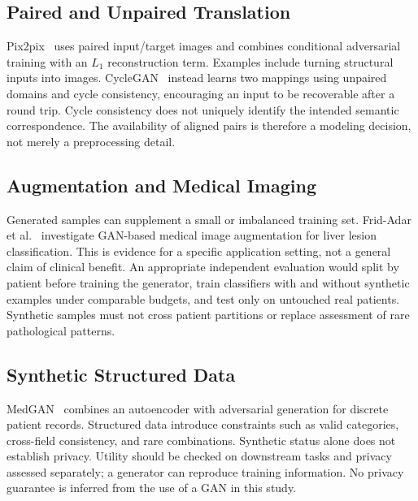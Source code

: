 \documentclass[conference]{IEEEtran}
\begin{document}
\subsection{Paired and Unpaired Translation}
Pix2pix~\cite{pix} uses paired input/target images and combines conditional adversarial training with an $L_1$ reconstruction term. Examples include turning structural inputs into images. CycleGAN~\cite{cycle} instead learns two mappings using unpaired domains and cycle consistency, encouraging an input to be recoverable after a round trip. Cycle consistency does not uniquely identify the intended semantic correspondence. The availability of aligned pairs is therefore a modeling decision, not merely a preprocessing detail.

\subsection{Augmentation and Medical Imaging}
Generated samples can supplement a small or imbalanced training set. Frid-Adar et al.~\cite{med} investigate GAN-based medical image augmentation for liver lesion classification. This is evidence for a specific application setting, not a general claim of clinical benefit. An appropriate independent evaluation would split by patient before training the generator, train classifiers with and without synthetic examples under comparable budgets, and test only on untouched real patients. Synthetic samples must not cross patient partitions or replace assessment of rare pathological patterns.

\subsection{Synthetic Structured Data}
MedGAN~\cite{records} combines an autoencoder with adversarial generation for discrete patient records. Structured data introduce constraints such as valid categories, cross-field consistency, and rare combinations. Synthetic status alone does not establish privacy. Utility should be checked on downstream tasks and privacy assessed separately; a generator can reproduce training information. No privacy guarantee is inferred from the use of a GAN in this study.
\end{document}

